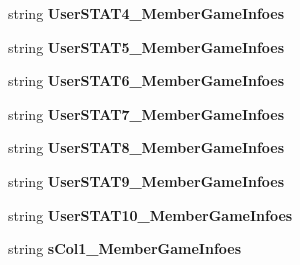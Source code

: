 \begin{DoxyCompactItemize}
\item 
string {\bfseries User\+S\+T\+A\+T4\+\_\+\+Member\+Game\+Infoes}\hypertarget{a00118_aa12ab14e0eb68afe38aafd841ae5e491}{}\label{a00118_aa12ab14e0eb68afe38aafd841ae5e491}

\item 
string {\bfseries User\+S\+T\+A\+T5\+\_\+\+Member\+Game\+Infoes}\hypertarget{a00118_ac3a12ba9b07b0676a66c66057ac4bf26}{}\label{a00118_ac3a12ba9b07b0676a66c66057ac4bf26}

\item 
string {\bfseries User\+S\+T\+A\+T6\+\_\+\+Member\+Game\+Infoes}\hypertarget{a00118_a9c28ee8d8516971b41952a6fa2b3ca4e}{}\label{a00118_a9c28ee8d8516971b41952a6fa2b3ca4e}

\item 
string {\bfseries User\+S\+T\+A\+T7\+\_\+\+Member\+Game\+Infoes}\hypertarget{a00118_a64820e2393fcaa12802e4dd652622b1a}{}\label{a00118_a64820e2393fcaa12802e4dd652622b1a}

\item 
string {\bfseries User\+S\+T\+A\+T8\+\_\+\+Member\+Game\+Infoes}\hypertarget{a00118_a464ab7d97da654ce02dda3866219108f}{}\label{a00118_a464ab7d97da654ce02dda3866219108f}

\item 
string {\bfseries User\+S\+T\+A\+T9\+\_\+\+Member\+Game\+Infoes}\hypertarget{a00118_ad977b471c477d9715898c7ae9eb8b283}{}\label{a00118_ad977b471c477d9715898c7ae9eb8b283}

\item 
string {\bfseries User\+S\+T\+A\+T10\+\_\+\+Member\+Game\+Infoes}\hypertarget{a00118_a5006cc15f2e791d7365c18fd1911dd85}{}\label{a00118_a5006cc15f2e791d7365c18fd1911dd85}

\item 
string {\bfseries s\+Col1\+\_\+\+Member\+Game\+Infoes}\hypertarget{a00118_a3a37ee0c20fa32d5a679ebfb52065a15}{}\label{a00118_a3a37ee0c20fa32d5a679ebfb52065a15}


\end{DoxyCompactItemize}
